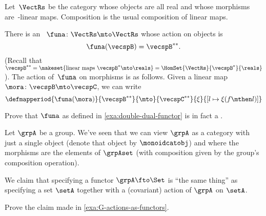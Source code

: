 \begin{example}
    \label{exa:double-dual-functor}
    Let~$\VectRs$ be the category whose objects are all real  and whose morphisms are~\reals-linear maps.
    Composition is the usual composition of linear maps.

    There is an ~$\funa \colon \VectRs \mto \VectRs$ whose action on objects is
    \begin{equation}
        \funa ( \vecspB ) = \vecspB^{**}.
    \end{equation}
    (Recall that~$\vecspB^{**} = \makeset{ \text{linear maps } \vecspB^* \mto \reals } =  \HomSet{\VectRs}{\vecspB^*}{\reals}$).
    The action of~$\funa$ on morphisms is as follows.
    Given a linear map~$\mora \colon \vecspB \mto \vecspC$, we can write
    \begin{equation}
        \defmapperiod{\funa ( \mora ) }{\vecspB^{**}}{\mto}{\vecspC^{**}}{\xi}{[ l \mapsto \xi (f \mthen l)]}
    \end{equation}
\end{example}

\begin{gradedexercise}
    \label{ex:DoubleDualFunctor}
    Prove that $\funa$ as defined in \cref{exa:double-dual-functor} is in fact a .
\end{gradedexercise}

\begin{example}\label{exa:G-actions-as-functors}
    Let $\grpA$ be a group.
    We've seen that we can view $\grpA$ as a category with just a single object (denote that object by $\monoidcatobj$) and where the morphisms are the elements of $\grpAset$ (with composition given by the group's composition operation).

    We claim that specifying a functor $\grpA \fto \Set$ is ``the same thing'' as specifying a set $\setA$ together with a (covariant) action of $\grpA$ on $\setA$.
\end{example}

\begin{exercise}
    Prove the claim made in \cref{exa:G-actions-as-functors}.
\end{exercise}
\begin{solution}
\end{solution}

% 

